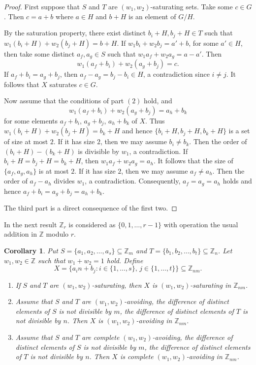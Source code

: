 \documentclass[11pt]{article}
\numberwithin{table}{section}
\newtheorem{corollary}[theorem]{Corollary}
\theoremstyle{definition}
\begin{document}
	\begin{proof} First suppose that $S$ and $T$ are $(w_1,w_2)$-saturating sets.
		Take some $c\in G$. Then $c=a+b$ where $a\in H$ and $b+H$ is an element of $G/H$.
		
		By the saturation property, there exist distinct $b_i+H, b_j+H \in T$ such that $w_1( b_i+H) + w_2 (b_j+H) =b+H$. 
		If $w_1b_i + w_2b_j = a'+ b$, for some $a'\in H$, then take some distinct  
		$a_f, a_g \in S$ such that $w_1a_f + w_2a_g=a- a'$.
		Then 
		\[w_1(a_f+b_i)+w_2(a_g+b_j)=c.\]
		If $a_f+b_i=a_g+b_j$, then $a_f-a_g=b_j-b_i \in H$, a contradiction since $i\neq j$. It follows that $X$ saturates $c\in G$. 
		
		Now assume that the conditions of part $(2)$ hold, and 
		\[w_1(a_f+ b_i)+w_2(a_g+b_j)= a_h+b_k\]
		for some elements $a_f+b_i$, $a_g+b_j$, $a_h+b_k$ of $X$. 
		Thus $w_1(b_i+H)+w_2(b_j+H)=b_k+H$ and hence $\{b_i+H, b_j+H, b_k+H\}$ is a set of size at most $2$. 
		If it has size $2$, then we may assume $b_i \neq b_k$. Then the order of $(b_i+H)-(b_k+H)$ is divisible by $w_1$, a contradiction. If $b_i+H=b_j+H=b_k+H$, then $w_1 a_f + w_2 a_g = a_h$. It follows that the size of $\{a_f,a_g,a_h\}$ is at most $2$. If it has size $2$, then we may assume $a_f \neq a_h$. Then the order of $a_f-a_h$ divides $w_1$, a contradiction. Consequently, $a_f=a_g=a_h$ holds and hence
		$a_f+b_i=a_g+b_j=a_h+b_k$. 
		
		The third part is a direct consequence of the first two.
	\end{proof}
	
	In the next result $\mathbb{Z}_r$ is considered as $\{0,1,\ldots,r-1\}$ with operation the usual addition in $\mathbb{Z}$ modulo $r$.
	
	\begin{corollary}
		\label{prodc} 
		Put $S=\{a_1,a_2,\ldots,a_s\} \subseteq \mathbb{Z}_m$ and $T=\{b_1,b_2,\ldots,b_t\} \subseteq \mathbb{Z}_n$. Let $w_1, w_2 \in \mathbb{Z}$ such that
		$w_1+w_2=1$ hold.
		Define
		\[X=\{a_i n + b_j : i\in \{1,\ldots,s\},\, j \in\{1,\ldots,t\}\} \subseteq \mathbb{Z}_{nm}.\]
		\begin{enumerate}[\rm(1)]
			\item If $S$ and $T$ are $(w_1,w_2)$-saturating, then
			$X$ is $(w_1,w_2)$-saturating in $\mathbb{Z}_{nm}$.
			\item Assume that $S$ and $T$ are $(w_1,w_2)$-avoiding, the difference of distinct elements of $S$ is not divisible by $m$, the difference of distinct elements of $T$ is not divisible by $n$. Then 
			$X$ is $(w_1,w_2)$-avoiding in $\mathbb{Z}_{nm}$.
			\item Assume that $S$ and $T$ are complete $(w_1,w_2)$-avoiding, the difference of distinct elements of $S$ is not divisible by $m$, the difference of distinct elements of $T$ is not divisible by $n$. Then
			$X$ is complete $(w_1,w_2)$-avoiding in $\mathbb{Z}_{nm}$.
		\end{enumerate}
	\end{corollary}
	
\end{document}
